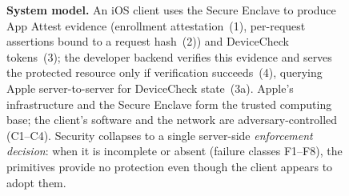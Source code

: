 \begin{figure}[t]

\caption{%
  \textbf{System model.} An iOS client uses the Secure Enclave to produce App Attest
  evidence (enrollment attestation~(1), per-request assertions bound to a request
  hash~(2)) and DeviceCheck tokens~(3); the developer backend verifies this evidence
  and serves the protected resource only if verification succeeds~(4), querying
  Apple server-to-server for DeviceCheck state~(3a). Apple's infrastructure and the
  Secure Enclave form the trusted computing base; the client's software and the
  network are adversary-controlled (C1--C4). Security collapses to a single
  server-side \emph{enforcement decision}: when it is incomplete or absent
  (failure classes F1--F8), the primitives provide no protection even though the
  client appears to adopt them.%
  \label{fig:system-model}}
\end{figure}
